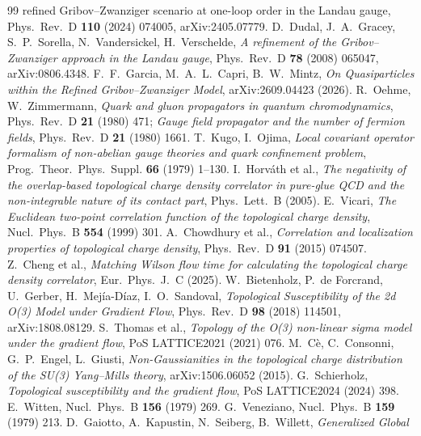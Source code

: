 \documentclass[11pt,a4paper]{article}
\theoremstyle{plain}
\theoremstyle{definition}
\theoremstyle{remark}
\renewcommand{\_}{\oldunderscore\allowbreak}
\begin{document}
\begin{thebibliography}{99}
{refined Gribov--Zwanziger scenario at one-loop order in the Landau gauge},
Phys.\ Rev.\ D \textbf{110} (2024) 074005, arXiv:2405.07779.
 D.~Dudal, J.~A.~Gracey, S.~P.~Sorella, N.~Vandersickel, H.~Verschelde,
\emph{A refinement of the Gribov--Zwanziger approach in the Landau gauge},
Phys.\ Rev.\ D \textbf{78} (2008) 065047, arXiv:0806.4348.
 F.~F.~Garcia, M.~A.~L.~Capri, B.~W.~Mintz,
\emph{On Quasiparticles within the Refined Gribov--Zwanziger Model}, arXiv:2609.04423 (2026).
 R.~Oehme, W.~Zimmermann, \emph{Quark and gluon propagators
in quantum chromodynamics}, Phys.\ Rev.\ D \textbf{21} (1980) 471; \emph{Gauge field
propagator and the number of fermion fields}, Phys.\ Rev.\ D \textbf{21} (1980) 1661.
 T.~Kugo, I.~Ojima, \emph{Local covariant operator formalism of
non-abelian gauge theories and quark confinement problem}, Prog.\ Theor.\ Phys.\ Suppl.
\textbf{66} (1979) 1--130.
 I.~Horv\'ath et al., \emph{The negativity of the overlap-based topological
charge density correlator in pure-glue QCD and the non-integrable nature of its contact part},
Phys.\ Lett.\ B (2005).
 E.~Vicari, \emph{The Euclidean two-point correlation function of the
topological charge density}, Nucl.\ Phys.\ B \textbf{554} (1999) 301.
 A.~Chowdhury et al., \emph{Correlation and localization properties of
topological charge density}, Phys.\ Rev.\ D \textbf{91} (2015) 074507.
 Z.~Cheng et al., \emph{Matching Wilson flow time for calculating the
topological charge density correlator}, Eur.\ Phys.\ J.\ C (2025).
 W.~Bietenholz, P.~de Forcrand, U.~Gerber, H.~Mej\'ia-D\'iaz,
I.~O.~Sandoval, \emph{Topological Susceptibility of the 2d O(3) Model under Gradient Flow},
Phys.\ Rev.\ D \textbf{98} (2018) 114501, arXiv:1808.08129.
 S.~Thomas et al., \emph{Topology of the O(3) non-linear sigma model under
the gradient flow}, PoS LATTICE2021 (2021) 076.
 M.~C\`e, C.~Consonni, G.~P.~Engel, L.~Giusti, \emph{Non-Gaussianities in the
topological charge distribution of the SU(3) Yang--Mills theory}, arXiv:1506.06052 (2015).
 G.~Schierholz, \emph{Topological susceptibility and the gradient flow},
PoS LATTICE2024 (2024) 398.
 E.~Witten, Nucl.\ Phys.\ B \textbf{156} (1979) 269.
 G.~Veneziano, Nucl.\ Phys.\ B \textbf{159} (1979) 213.
 D.~Gaiotto, A.~Kapustin, N.~Seiberg, B.~Willett, \emph{Generalized Global
}
\end{thebibliography}
\end{document}
